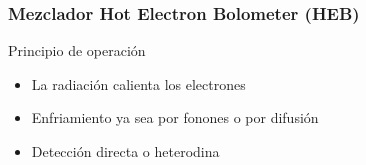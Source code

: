 \documentclass{beamer}
\begin{document}
\begin{frame}
				\frametitle{Mezclador Hot Electron Bolometer (HEB)}
				\begin{block}{Principio de operación}
				\begin{itemize}
								\item La radiación calienta los electrones
								\item Enfriamiento ya sea por fonones o por difusión
								\item Detección directa o heterodina
				\end{itemize}
				\end{block}
								\begin{center}
								\end{center}
\end{frame} 
\end{document}
